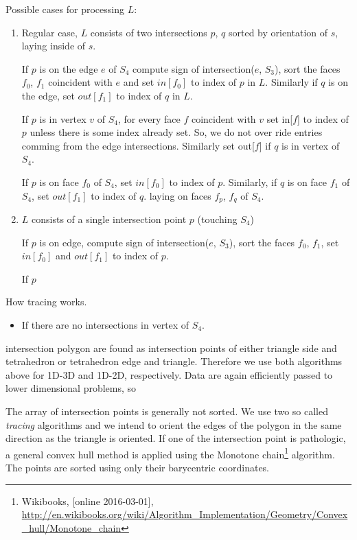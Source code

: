 \documentclass{elsarticle}
\begin{document}
  
Possible cases for processing $L$:
\begin{enumerate}
 \item Regular case, $L$ consists of two intersections $p$, $q$ sorted by orientation of $s$, laying inside of $s$.
 
 If $p$ is on the edge $e$ of $S_4$ compute sign of intersection($e$, $S_3$), sort the faces $f_0$, $f_1$ coincident with $e$
 and set $in[f_0]$ to index of $p$ in $L$. Similarly if $q$ is on the edge, set $out[f_1]$ to index of $q$ in $L$.
 
 If $p$ is in vertex $v$ of $S_4$, for every face $f$ coincident with $v$ set
 in[$f$] to index of $p$ unless there is some index already set. So, we do not over ride
 entries comming from the edge intersections. Similarly set out[$f$] if $q$ is in vertex of $S_4$.
 
 If $p$ is on face $f_0$ of $S_4$, set $in[f_0]$ to index of $p$. Similarly, if $q$ is on face $f_1$ of $S_4$, set $out[f_1]$ to index of $q$.
 laying on faces $f_p$, $f_q$ of $S_4$.
 
 \item $L$ consists of a single intersection point $p$ (touching $S_4$)
 
 
 If $p$ is on edge, compute sign of intersection($e$, $S_3$), sort the faces $f_0$, $f_1$,
 set $in[f_0]$ and $out[f_1]$ to index of $p$.
 
 If $p$
\end{enumerate}

How tracing works.
\begin{itemize}
 \item If there are no intersections in vertex of $S_4$. 
\end{itemize}

  
  



intersection polygon
are found as intersection points of either triangle side and tetrahedron or tetrahedron edge and triangle.
Therefore we use both algorithms above for 1D-3D and 1D-2D, respectively. Data are again efficiently passed
to lower dimensional problems, so 

The array of intersection points is generally not sorted. We use two so called \emph{tracing} algorithms and we
intend to orient the edges of the polygon in the same direction as the triangle is oriented.
If one of the intersection point is pathologic, a general convex hull method is applied using the Monotone 
chain\footnote{Wikibooks, [online 2016-03-01], 
      \url{http://en.wikibooks.org/wiki/Algorithm_Implementation/Geometry/Convex_hull/Monotone_chain}} 
algorithm. The points are sorted using only their barycentric coordinates.
\end{document}
